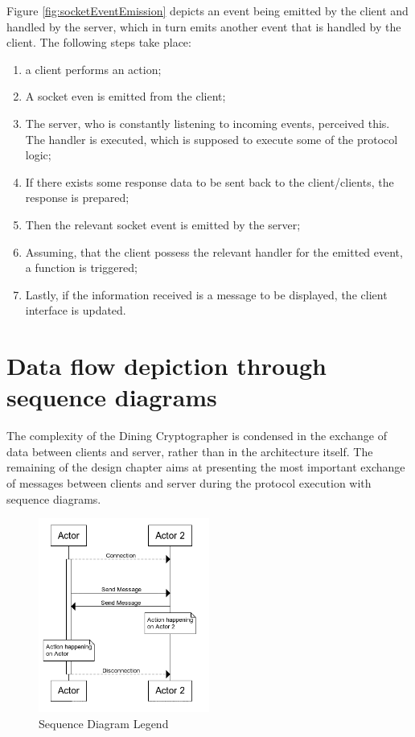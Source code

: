 Figure \ref{fig:socketEventEmission} depicts an event being emitted by the client and handled by the server, which in turn emits another event that is handled by the client. The following steps take place:
\begin{enumerate}
    \item a client performs an action;
    \item A socket even is emitted from the client;
    \item The server, who is constantly listening to incoming events, perceived this. The handler is executed, which is supposed to execute some of the protocol logic;
    \item If there exists some response data to be sent back to the client/clients, the response is prepared;
    \item Then the relevant socket event is emitted by the server;
    \item Assuming, that the client possess the relevant handler for the emitted event, a function is triggered;
    \item Lastly, if the information received is a message to be displayed, the client interface is updated.
\end{enumerate}
  

\section{Data flow depiction through sequence diagrams}

The complexity of the Dining Cryptographer is condensed in the exchange of data between clients and server, rather than in the architecture itself. The remaining of the design chapter aims at presenting the most important exchange of messages between clients and server during the protocol execution with sequence diagrams. \newline


\begin{figure}[H]
    \centering
    \includegraphics[width=0.5\textwidth]{Images/Design/seqDiagramLegend.png}
    \caption{Sequence Diagram Legend}
    \label{fig:sequenceDiagramLegend}
\end{figure}

